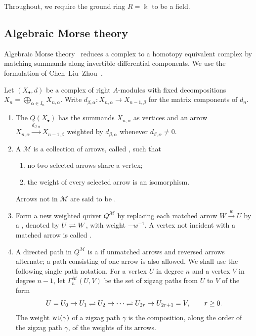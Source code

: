 \documentclass[a4paper,leqno]{amsart}
\begin{document}
Throughout, we require the ground ring $R=\Bbbk$ to be a field.

\subsection{Algebraic Morse theory}
\label{subsec:algebraic-morse}

Algebraic Morse theory~\cite{Sko06,JW09} reduces a complex to a homotopy equivalent complex by matching summands along invertible differential components. We use the formulation of Chen--Liu--Zhou~\cite[Section~3]{CLZ26}.


\begin{dfn}\label{dfn:morse-matching}
Let $(X_\bullet,d)$ be a complex of right $A$-modules with fixed decompositions $X_n=\bigoplus_{\alpha\in I_n}X_{n,\alpha}$. Write $d_{\beta,\alpha}\colon X_{n,\alpha}\to X_{n-1,\beta}$ for the matrix components of $d_n$.
\begin{enumerate}
\item The  $Q(X_\bullet)$ has the summands $X_{n,\alpha}$ as vertices and an arrow $X_{n,\alpha}\xrightarrow{d_{\beta,\alpha}}X_{n-1,\beta}$ weighted by $d_{\beta,\alpha}$ whenever $d_{\beta,\alpha}\neq0$.

\item A  $\mathcal M$ is a collection of arrows, called , such that
\begin{enumerate}
\item no two selected arrows share a vertex;
\item the weight of every selected arrow is an isomorphism.
\end{enumerate}
Arrows not in $\mathcal M$ are said to be .

\item Form a new weighted quiver $Q^{\mathcal M}$ by
replacing each matched arrow $W\xrightarrow{w}U$ by a , denoted by $U\rightleftharpoons W$, with weight $-w^{-1}$.
A vertex not incident with a matched arrow is called .

\item A directed path in $Q^{\mathcal M}$ is a  if unmatched arrows and reversed arrows alternate; a path consisting of one arrow is also allowed.  We shall use the following single path notation.  For a vertex $U$ in degree $n$ and a vertex $V$ in degree $n-1$, let $\Gamma_n^{\mathcal M}(U,V)$ be the set of zigzag paths from $U$ to $V$ of the form
\[
 U=U_0\rightarrow U_1
 \rightleftharpoons U_2
 \rightarrow\cdots
 \rightleftharpoons U_{2r}
 \rightarrow U_{2r+1}=V,
 \qquad r\geq0.
\]
The weight $\operatorname{wt}(\gamma)$ of a zigzag path $\gamma$ is the composition, along the order of the zigzag path $\gamma$, of the weights of its arrows.


\end{enumerate}
\end{dfn}
\end{document}
